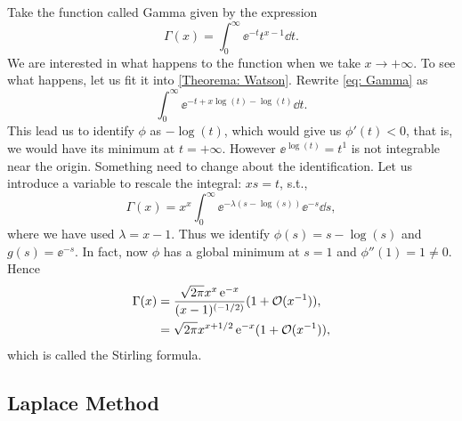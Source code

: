 \begin{exemplo}
	Take the function called Gamma given by the expression
	\begin{equation}
		\Gamma(x) = \int_{0}^{\infty} \ee^{-t} t^{x-1} \dd t.
		\label{eq: Gamma}
	\end{equation}
	We are interested in what happens to the function when we take $x \rightarrow +\infty$. To see what happens, let us fit it into \autoref{Theorema: Watson}. Rewrite \eqref{eq: Gamma} as
	\begin{equation}
		\int_{0}^{\infty} \ee^{-t+x\log{(t)}-\log{(t)}} \dd t.
	\end{equation} 
	This lead us to identify $\phi$ as $-\log{(t)}$, which would give us $\phi'(t) < 0$, that is, we would have its minimum at $t=+\infty$. However $\ee^{\log{(t)}} = t^1$ is not integrable near the origin. Something need to change about the identification. Let us introduce a variable to rescale the integral: $xs = t$, s.t.,
	\begin{equation}
		\Gamma(x) = x^x \int_{0}^{\infty} \ee^{-\lambda(s - \log{(s)})} \ee^{-s} \dd s,
	\end{equation}
	where we have used $\lambda = x - 1$. Thus we identify $\phi(s) = s - \log(s)$ and $g(s) = \ee^{-s}$. In fact, now $\phi$ has a global minimum at $s = 1$ and $\phi''(1) = 1 \neq 0$. Hence
	\begin{align}
		\Gamma(x) & = \frac{\sqrt{2\pi} x^x \operatorname{e}^{-x}}{(x-1)^{(-1/2)}} (1 + \mathcal{O}(x^{-1})), \\
		& = \sqrt{2\pi} x^{x + 1/2} \operatorname{e}^{-x} (1 + \mathcal{O}(x^{-1})),
	\end{align}
	which is called the Stirling formula.
\end{exemplo}

\subsection{Laplace Method}
\label{subsection: Laplace}

